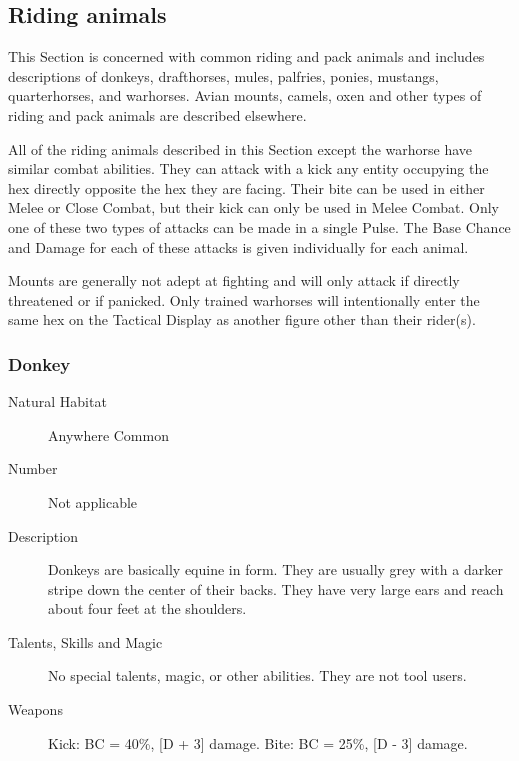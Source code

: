 \begin{multicols}{2}

\setlength\columnseprule{0.2mm}

\section{Riding animals}
This Section is concerned with common riding and pack animals and
includes descriptions of donkeys, drafthorses, mules, palfries,
ponies, mustangs, quarterhorses, and warhorses.  Avian mounts, camels,
oxen and other types of riding and pack animals are described
elsewhere.

All of the riding animals described in this Section except the
warhorse have similar combat abilities.  They can attack with a kick
any entity occupying the hex directly opposite the hex they are
facing.  Their bite can be used in either Melee or Close Combat, but
their kick can only be used in Melee Combat.  Only one of these two
types of attacks can be made in a single Pulse.  The Base Chance and
Damage for each of these attacks is given individually for each
animal.

Mounts are generally not adept at fighting and will only attack if
directly threatened or if panicked.  Only trained warhorses will
intentionally enter the same hex on the Tactical Display as another
figure other than their rider(s).

\subsubsection{Donkey}

\begin{description}
\item[Natural Habitat]  Anywhere Common

\item[Number] Not applicable

\item[Description] Donkeys are basically equine in form. They are usually
grey with a darker stripe down the center of their backs.  They have
very large ears and reach about four feet at the shoulders.

\item[Talents, Skills and Magic] No special talents, magic, or other abilities. They are not
tool users.

\item[Weapons] Kick: BC = 40\%, [D + 3] damage. Bite: BC = 25\%, [D - 3] damage.


\end{description}
\end{multicols}

